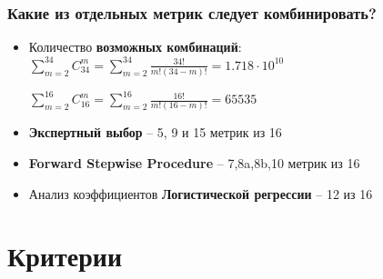 \documentclass{beamer}
\begin{document}
\begin{frame}
\frametitle{Какие из отдельных метрик следует комбинировать?}

\begin{itemize}
\item Количество \textbf{возможных комбинаций}:
 $\sum_{m=2}^{34}C_{34}^m=\sum_{m=2}^{34}\frac{34!}{m!(34-m)!}=1.718 \cdot 10^{10}$
 
$\sum_{m=2}^{16}C_{16}^m=\sum_{m=2}^{16}\frac{16!}{m!(16-m)!}=65535$
 
\item \textbf{Экспертный выбор} -- 5, 9 и 15 метрик из 16
\item \textbf{Forward Stepwise Procedure} -- 7,8a,8b,10 метрик из 16
\item Анализ коэффициентов \textbf{Логистической регрессии} -- 12 из 16


\end{itemize}
\end{frame}
  

\section{Критерии}
\end{document}
